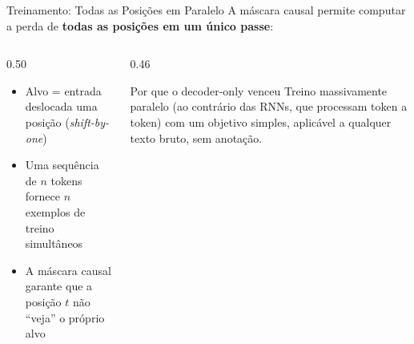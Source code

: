 \documentclass[aspectratio=169, xcolor=dvipsnames]{beamer}
\begin{document}
  \begin{frame}{Treinamento: Todas as Posições em Paralelo}
    A máscara causal permite computar a perda de \textbf{todas as posições em um único passe}:\\[0.4em]
    \begin{center}
    \end{center}
    \vspace{0.4em}
    \begin{columns}[T]
      \begin{column}{0.50\textwidth}
        \begin{itemize}
          \item Alvo = entrada deslocada uma posição (\textit{shift-by-one})
          \item Uma sequência de $n$ tokens fornece $n$ exemplos de treino simultâneos
          \item A máscara causal garante que a posição $t$ não ``veja'' o próprio alvo
        \end{itemize}
      \end{column}
      \begin{column}{0.46\textwidth}
        \begin{alertblock}{Por que o decoder-only venceu}
          Treino massivamente paralelo (ao contrário das RNNs, que processam token a token) com um objetivo simples, aplicável a qualquer texto bruto, sem anotação.
        \end{alertblock}
      \end{column}
    \end{columns}
  \end{frame}
\end{document}
